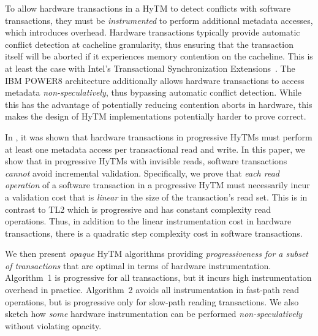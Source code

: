 To allow hardware transactions in a HyTM to detect conflicts with software transactions, they must be \emph{instrumented} to perform additional metadata accesses, which introduces overhead.
Hardware transactions typically provide automatic conflict detection at cacheline granularity,
thus ensuring that the transaction itself will be aborted if it experiences memory contention on the cacheline.
This is at least the case with Intel's Transactional Synchronization Extensions~\cite{haswell}.
The IBM POWER8 architecture additionally allows hardware transactions to access metadata \emph{non-speculatively}, 
thus bypassing automatic conflict detection. While this has the advantage of potentially reducing contention aborts
in hardware, this makes the design of HyTM implementations potentially harder to prove correct.

In \cite{htmdisc15}, it was shown that hardware transactions in progressive HyTMs must perform
at least one metadata access per transactional read and write.
In this paper, we show that in progressive HyTMs with invisible reads, 
software transactions \textit{cannot} avoid incremental validation.
Specifically, we prove that \textit{each read operation} of a software transaction in a progressive HyTM
must necessarily incur a validation cost that is \emph{linear} 
in the size of the transaction's read set. 
This is in contrast to TL2 which is progressive and has constant complexity read operations.
Thus, in addition to the linear instrumentation cost in hardware transactions, there is a quadratic step complexity cost in software transactions.

We then present \emph{opaque} HyTM algorithms providing \emph{progressiveness for a subset of transactions} that are  %
optimal in terms of hardware instrumentation.
Algorithm~1 is progressive for all transactions, but it incurs high instrumentation overhead in practice.
Algorithm~2 avoids all instrumentation in fast-path read operations, but is progressive only for slow-path reading transactions.
We also sketch how \emph{some} hardware instrumentation can be performed \textit{non-speculatively} without violating opacity.

